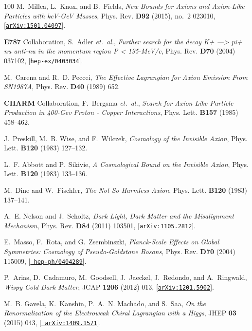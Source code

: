 \documentclass[11pt]{article}
\renewcommand{\[}{\begin{equation}}
\renewcommand{\]}{\end{equation}}
\begin{document}
\begin{thebibliography}{100}
M.~Millea, L.~Knox, and B.~Fields, {\it {New Bounds for Axions and Axion-Like
  Particles with keV-GeV Masses}},  Phys. Rev. {\bf D92} (2015), no.~2 023010,
  [\href{http://xxx.lanl.gov/abs/1501.04097}{{\tt arXiv:1501.04097}}].

{\bf E787} Collaboration, S.~Adler {\em et.~al.}, {\it {Further search for the
  decay K+ ---> pi+ nu anti-nu in the momentum region P < 195-MeV/c}},  Phys.
  Rev. {\bf D70} (2004) 037102,
  [\href{http://xxx.lanl.gov/abs/hep-ex/0403034}{{\tt hep-ex/0403034}}].

M.~Carena and R.~D. Peccei, {\it {The Effective Lagrangian for Axion Emission
  From {SN1987A}}},  Phys. Rev. {\bf D40} (1989) 652.

{\bf CHARM} Collaboration, F.~Bergsma {\em et.~al.}, {\it {Search for Axion
  Like Particle Production in 400-{Gev} Proton - Copper Interactions}},  Phys.
  Lett. {\bf B157} (1985) 458--462.

J.~Preskill, M.~B. Wise, and F.~Wilczek, {\it {Cosmology of the Invisible
  Axion}},  Phys. Lett. {\bf B120} (1983) 127--132.

L.~F. Abbott and P.~Sikivie, {\it {A Cosmological Bound on the Invisible
  Axion}},  Phys. Lett. {\bf B120} (1983) 133--136.

M.~Dine and W.~Fischler, {\it {The Not So Harmless Axion}},  Phys. Lett. {\bf
  B120} (1983) 137--141.

A.~E. Nelson and J.~Scholtz, {\it {Dark Light, Dark Matter and the Misalignment
  Mechanism}},  Phys. Rev. {\bf D84} (2011) 103501,
  [\href{http://xxx.lanl.gov/abs/1105.2812}{{\tt arXiv:1105.2812}}].

E.~Masso, F.~Rota, and G.~Zsembinszki, {\it {Planck-Scale Effects on Global
  Symmetries: Cosmology of Pseudo-Goldstone Bosons}},  Phys. Rev. {\bf D70}
  (2004) 115009, [\href{http://xxx.lanl.gov/abs/hep-ph/0404289}{{\tt
  hep-ph/0404289}}].

P.~Arias, D.~Cadamuro, M.~Goodsell, J.~Jaeckel, J.~Redondo, and A.~Ringwald,
  {\it {Wispy Cold Dark Matter}},  JCAP {\bf 1206} (2012) 013,
  [\href{http://xxx.lanl.gov/abs/1201.5902}{{\tt arXiv:1201.5902}}].

M.~B. Gavela, K.~Kanshin, P.~A.~N. Machado, and S.~Saa, {\it {On the
  Renormalization of the Electroweak Chiral Lagrangian with a Higgs}},  JHEP
  {\bf 03} (2015) 043, [\href{http://xxx.lanl.gov/abs/1409.1571}{{\tt
  arXiv:1409.1571}}].


\end{thebibliography}
\end{document}
